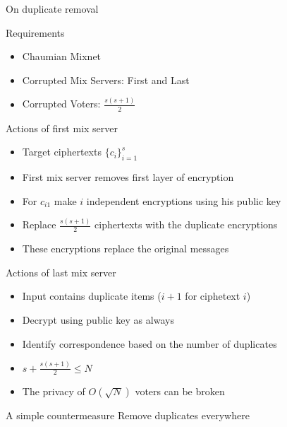 \documentclass{beamer}
\begin{document}
\begin{frame}[allowframebreaks]{On duplicate removal}

\begin{block}{Requirements}
\begin{itemize}
\item Chaumian Mixnet
\item Corrupted Mix Servers: First and Last
\item Corrupted Voters:   $\frac{s(s+1)}{2}$
\end{itemize}
\end{block}

\begin{block}{Actions of first mix server}
\begin{itemize}
\item Target ciphertexts  $\{c_i\}_{i=1}^s$
\item First mix server removes first layer of encryption
\item For $c_{i1}$ make $i$ independent encryptions using his public key
\item Replace $\frac{s(s+1)}{2}$ ciphertexts with the duplicate encryptions
\item These encryptions replace the original messages
\end{itemize}
\end{block}

\begin{block}{Actions of last mix server}
\begin{itemize}
\item Input contains duplicate items ($i+1$ for ciphetext $i$)
\item Decrypt using public key as always
\item Identify correspondence based on the number of duplicates
\item $s+\frac{s(s+1)}{2} \leq N $
\item The privacy of $O(\sqrt{N})$ voters can be broken
\end{itemize}
\end{block}

\begin{block}{A simple countermeasure}
Remove duplicates everywhere
\end{block}

\end{frame}
\end{document}
